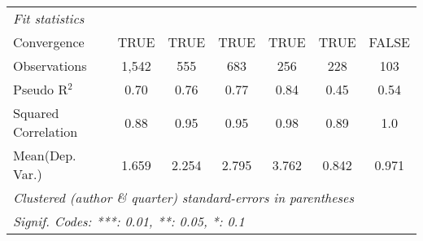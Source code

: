 \begin{tabular}{lcccccc}
   \midrule
   \emph{Fit statistics}\\
   Convergence                                                &TRUE           & TRUE          & TRUE          & TRUE    & TRUE         & FALSE\\  
   Observations                                               & 1,542         & 555           & 683           & 256     & 228          & 103\\  
   Pseudo R$^2$                                               & 0.70          & 0.76          & 0.77          & 0.84    & 0.45         & 0.54\\  
   Squared Correlation                                        & 0.88          & 0.95          & 0.95          & 0.98    & 0.89         & 1.0\\  
Mean(Dep. Var.) & 1.659 & 2.254 & 2.795 & 3.762 & 0.842 & 0.971 \\
   \midrule \midrule
   \multicolumn{7}{l}{\emph{Clustered (author \& quarter) standard-errors in parentheses}}\\
   \multicolumn{7}{l}{\emph{Signif. Codes: ***: 0.01, **: 0.05, *: 0.1}}\\
\end{tabular}
\par\endgroup
